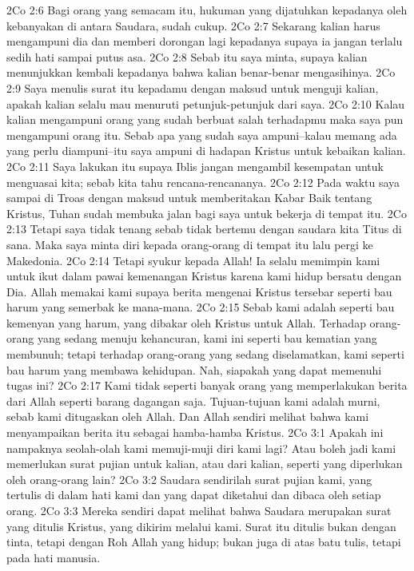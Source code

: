 2Co 2:6  Bagi orang yang semacam itu, hukuman yang dijatuhkan kepadanya oleh kebanyakan di antara Saudara, sudah cukup.
2Co 2:7  Sekarang kalian harus mengampuni dia dan memberi dorongan lagi kepadanya supaya ia jangan terlalu sedih hati sampai putus asa.
2Co 2:8  Sebab itu saya minta, supaya kalian menunjukkan kembali kepadanya bahwa kalian benar-benar mengasihinya.
2Co 2:9  Saya menulis surat itu kepadamu dengan maksud untuk menguji kalian, apakah kalian selalu mau menuruti petunjuk-petunjuk dari saya.
2Co 2:10  Kalau kalian mengampuni orang yang sudah berbuat salah terhadapmu maka saya pun mengampuni orang itu. Sebab apa yang sudah saya ampuni--kalau memang ada yang perlu diampuni--itu saya ampuni di hadapan Kristus untuk kebaikan kalian.
2Co 2:11  Saya lakukan itu supaya Iblis jangan mengambil kesempatan untuk menguasai kita; sebab kita tahu rencana-rencananya.
2Co 2:12  Pada waktu saya sampai di Troas dengan maksud untuk memberitakan Kabar Baik tentang Kristus, Tuhan sudah membuka jalan bagi saya untuk bekerja di tempat itu.
2Co 2:13  Tetapi saya tidak tenang sebab tidak bertemu dengan saudara kita Titus di sana. Maka saya minta diri kepada orang-orang di tempat itu lalu pergi ke Makedonia.
2Co 2:14  Tetapi syukur kepada Allah! Ia selalu memimpin kami untuk ikut dalam pawai kemenangan Kristus karena kami hidup bersatu dengan Dia. Allah memakai kami supaya berita mengenai Kristus tersebar seperti bau harum yang semerbak ke mana-mana.
2Co 2:15  Sebab kami adalah seperti bau kemenyan yang harum, yang dibakar oleh Kristus untuk Allah. Terhadap orang-orang yang sedang menuju kehancuran, kami ini seperti bau kematian yang membunuh; tetapi terhadap orang-orang yang sedang diselamatkan, kami seperti bau harum yang membawa kehidupan. Nah, siapakah yang dapat memenuhi tugas ini?
2Co 2:17  Kami tidak seperti banyak orang yang memperlakukan berita dari Allah seperti barang dagangan saja. Tujuan-tujuan kami adalah murni, sebab kami ditugaskan oleh Allah. Dan Allah sendiri melihat bahwa kami menyampaikan berita itu sebagai hamba-hamba Kristus.
2Co 3:1  Apakah ini nampaknya seolah-olah kami memuji-muji diri kami lagi? Atau boleh jadi kami memerlukan surat pujian untuk kalian, atau dari kalian, seperti yang diperlukan oleh orang-orang lain?
2Co 3:2  Saudara sendirilah surat pujian kami, yang tertulis di dalam hati kami dan yang dapat diketahui dan dibaca oleh setiap orang.
2Co 3:3  Mereka sendiri dapat melihat bahwa Saudara merupakan surat yang ditulis Kristus, yang dikirim melalui kami. Surat itu ditulis bukan dengan tinta, tetapi dengan Roh Allah yang hidup; bukan juga di atas batu tulis, tetapi pada hati manusia.
